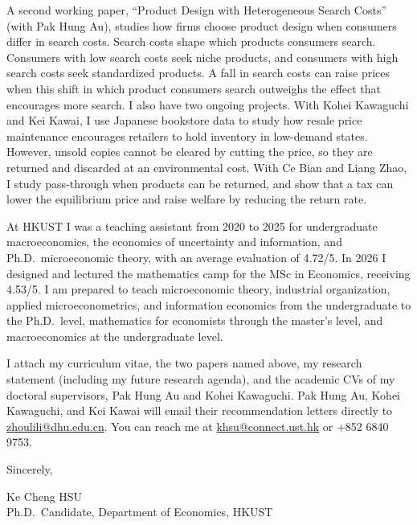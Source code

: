 \documentclass[11pt]{article}
\begin{document}
A second working paper, ``Product Design with Heterogeneous Search Costs'' (with Pak Hung Au), studies how firms choose product design when consumers differ in search costs. Search costs shape which products consumers search. Consumers with low search costs seek niche products, and consumers with high search costs seek standardized products. A fall in search costs can raise prices when this shift in which product consumers search outweighs the effect that encourages more search. I also have two ongoing projects. With Kohei Kawaguchi and Kei Kawai, I use Japanese bookstore data to study how resale price maintenance encourages retailers to hold inventory in low-demand states. However, unsold copies cannot be cleared by cutting the price, so they are returned and discarded at an environmental cost. With Ce Bian and Liang Zhao, I study pass-through when products can be returned, and show that a tax can lower the equilibrium price and raise welfare by reducing the return rate.

At HKUST I was a teaching assistant from 2020 to 2025 for undergraduate macroeconomics, the economics of uncertainty and information, and Ph.D.\ microeconomic theory, with an average evaluation of 4.72/5. In 2026 I designed and lectured the mathematics camp for the MSc in Economics, receiving 4.53/5. I am prepared to teach microeconomic theory, industrial organization, applied microeconometrics, and information economics from the undergraduate to the Ph.D.\ level, mathematics for economists through the master's level, and macroeconomics at the undergraduate level.

I attach my curriculum vitae, the two papers named above, my research statement (including my future research agenda), and the academic CVs of my doctoral supervisors, Pak Hung Au and Kohei Kawaguchi. Pak Hung Au, Kohei Kawaguchi, and Kei Kawai will email their recommendation letters directly to \href{mailto:zhoulili@dhu.edu.cn}{zhoulili@dhu.edu.cn}. You can reach me at \href{mailto:khsu@connect.ust.hk}{khsu@connect.ust.hk} or +852 6840 9753.

\vspace{0.45em}
Sincerely,

\vspace{0.45em}
Ke Cheng HSU \\
Ph.D.\ Candidate, Department of Economics, HKUST
\end{document}
